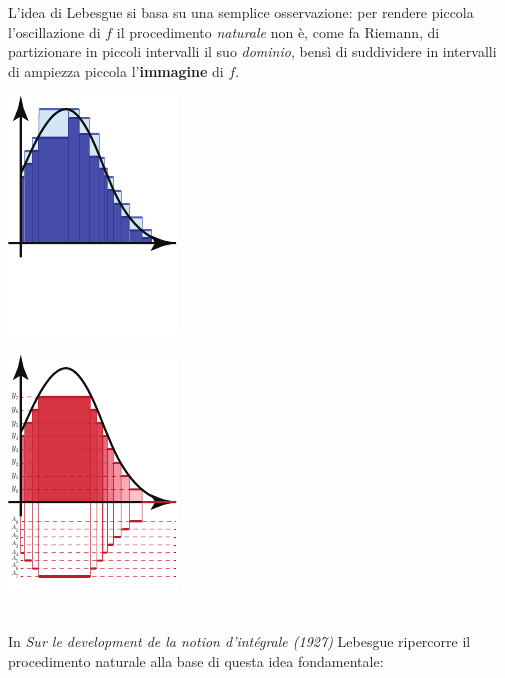 L’idea di Lebesgue si basa su una semplice osservazione: per rendere piccola l’oscillazione di $f$ il procedimento \textit{naturale} non è, come fa Riemann, di partizionare in piccoli intervalli il suo \textit{dominio}, bensì di suddividere in intervalli
di ampiezza piccola l’\textbf{immagine} di $f$.\\
\begin{minipage}{0.5\textwidth}
	\begin{center}
		\includegraphics[trim=0cm 0cm 0cm 0cm, clip, scale=1.6]{images/lebesgueriemann1}
	\end{center}
\end{minipage}
\begin{minipage}{0.5\textwidth}
	\begin{center}
		\includegraphics[trim=0cm 0cm 0cm 0cm, clip, scale=1.6]{images/lebesgueriemann2}
	\end{center}
\end{minipage}\\
In \textit{Sur le development de la notion d'intégrale (1927)} Lebesgue ripercorre il procedimento naturale alla base di questa idea fondamentale:
